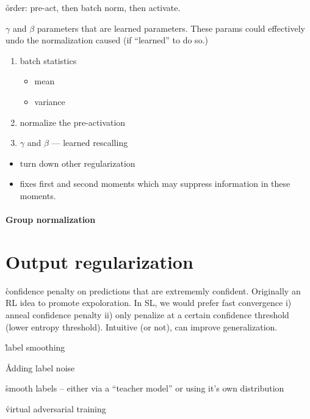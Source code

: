 \r{order: pre-act, then batch norm, then activate.}

\r{$\gamma$ and $\beta$ parameters that are learned parameters. These params could effectively undo the normalization caused (if ``learned'' to do so.)}

\begin{enumerate}[noitemsep,topsep=0pt]
	\item batch statistics
	\begin{itemize}[noitemsep,topsep=0pt]
		\item mean
		\item variance
	\end{itemize}
	\item normalize the pre-activation
	\item $\gamma$ and $\beta$ --- learned rescalling
\end{enumerate}


\begin{itemize}[noitemsep,topsep=0pt]
	\item turn down other regularization
	\item fixes first and second moments which may suppress information in these moments.
\end{itemize}



\paragraph{Group normalization}


\section{Output regularization}

\r{confidence penalty on predictions that are extrememly confident\cite{pereyra2017regularizing}. Originally an RL idea to promote expoloration. In SL, we would prefer fast convergence i) anneal confidence penalty ii) only penalize at a certain confidence threshold (lower entropy threshold). Intuitive (or not), can improve generalization.}

\r{label smoothing\cite{szegedy2016rethinking}}

\r{Adding label noise\cite{xie2016disturblabel}}

\r{smooth labels -- either via a ``teacher model''\cite{hinton2015distilling} or using it's own distribution\cite{reed2014training}}


\r{virtual adversarial training\cite{miyato2018virtual}}
